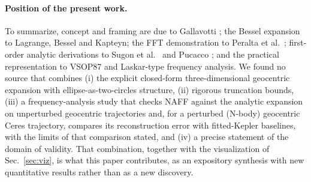 \paragraph*{Position of the present work.}
To summarize, concept and framing are due to Gallavotti
\cite{Gallavotti2001}; the Bessel expansion to Lagrange, Bessel and
Kapteyn; the FFT demonstration to Peralta et al.\
\cite{Peralta2003}; first-order analytic derivations to Sugon et al.\
\cite{Sugon2008} and Pucacco \cite{Pucacco2012}; and the practical
representation to VSOP87 and Laskar-type frequency analysis. We found no
source that combines (i) the explicit closed-form three-dimensional
geocentric expansion with ellipse-as-two-circles structure, (ii) rigorous
truncation bounds, (iii) a frequency-analysis study that checks NAFF against the analytic
expansion on unperturbed geocentric trajectories and, for a perturbed
(N-body) geocentric Ceres trajectory, compares its reconstruction error with
fitted-Kepler baselines, with the limits of that comparison stated, and (iv) a precise statement of the domain of validity. That
combination, together with the visualization of
Sec.~\ref{sec:viz}, is what this paper contributes, as an expository
synthesis with new quantitative results rather than as a new discovery.
